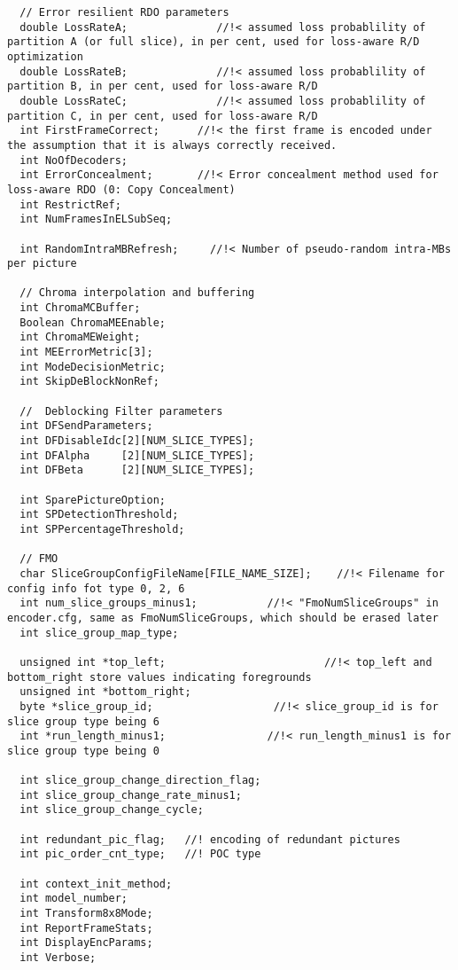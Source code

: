 \begin{lstlisting}
  // Error resilient RDO parameters
  double LossRateA;              //!< assumed loss probablility of partition A (or full slice), in per cent, used for loss-aware R/D optimization
  double LossRateB;              //!< assumed loss probablility of partition B, in per cent, used for loss-aware R/D
  double LossRateC;              //!< assumed loss probablility of partition C, in per cent, used for loss-aware R/D
  int FirstFrameCorrect;      //!< the first frame is encoded under the assumption that it is always correctly received.
  int NoOfDecoders;
  int ErrorConcealment;       //!< Error concealment method used for loss-aware RDO (0: Copy Concealment)
  int RestrictRef;
  int NumFramesInELSubSeq;

  int RandomIntraMBRefresh;     //!< Number of pseudo-random intra-MBs per picture

  // Chroma interpolation and buffering
  int ChromaMCBuffer;
  Boolean ChromaMEEnable;
  int ChromaMEWeight;
  int MEErrorMetric[3];
  int ModeDecisionMetric;
  int SkipDeBlockNonRef;
  
  //  Deblocking Filter parameters
  int DFSendParameters;
  int DFDisableIdc[2][NUM_SLICE_TYPES];
  int DFAlpha     [2][NUM_SLICE_TYPES];
  int DFBeta      [2][NUM_SLICE_TYPES];

  int SparePictureOption;
  int SPDetectionThreshold;
  int SPPercentageThreshold;

  // FMO
  char SliceGroupConfigFileName[FILE_NAME_SIZE];    //!< Filename for config info fot type 0, 2, 6
  int num_slice_groups_minus1;           //!< "FmoNumSliceGroups" in encoder.cfg, same as FmoNumSliceGroups, which should be erased later
  int slice_group_map_type;

  unsigned int *top_left;                         //!< top_left and bottom_right store values indicating foregrounds
  unsigned int *bottom_right;
  byte *slice_group_id;                   //!< slice_group_id is for slice group type being 6
  int *run_length_minus1;                //!< run_length_minus1 is for slice group type being 0

  int slice_group_change_direction_flag;
  int slice_group_change_rate_minus1;
  int slice_group_change_cycle;

  int redundant_pic_flag;   //! encoding of redundant pictures
  int pic_order_cnt_type;   //! POC type

  int context_init_method;
  int model_number;
  int Transform8x8Mode;
  int ReportFrameStats;
  int DisplayEncParams;
  int Verbose;


\end{lstlisting}
